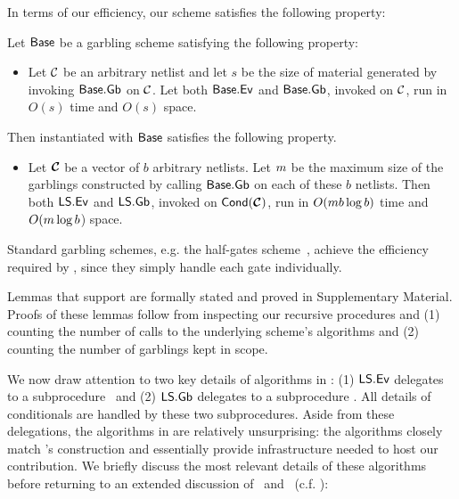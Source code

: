 In terms of our efficiency, our scheme satisfies the following
property:
\begin{theorem}\label{thm:efficiency}
  Let $\textsf{Base}$ be a garbling scheme satisfying the following
  property:
  \begin{itemize}
    \item Let $\mathcal C$ be an arbitrary netlist and let $s$ be the size of
      material generated by invoking $\textsf{Base}.\textsf{Gb}$ on $\mathcal C$.
      Let both $\textsf{Base}.\textsf{Ev}$ and $\textsf{Base}.\textsf{Gb}$, invoked
      on $\mathcal C$, run in $O(s)$ time and $O(s)$ space.
  \end{itemize}
  Then  instantiated with $\textsf{Base}$ satisfies the
  following property.
  \begin{itemize}
    \item Let $\vec{\cir}$ be a vector of $b$ arbitrary netlists. Let $m$ be
      the maximum size of the garblings constructed by calling
      $\textsf{Base}.\textsf{Gb}$ on each of these $b$ netlists.
      Then both $\textsf{LS}.\textsf{Ev}$ and $\textsf{LS}.\textsf{Gb}$, invoked on
      $\conditional(\vec{\cir})$, run in
      $O(m b \log b)$ time and $O(m \log b$) space.
  \end{itemize}
\end{theorem}
Standard garbling schemes, e.g. the
half-gates scheme~\cite{EC:ZahRosEva15}, achieve the efficiency
required by , since they simply handle each gate
individually.

Lemmas that support  are formally stated and proved in
Supplementary Material.
Proofs of these lemmas follow from inspecting our recursive procedures
and (1) counting the number of calls to the underlying scheme's
algorithms and (2) counting the number of garblings kept in scope.

We now draw attention to two key details of algorithms in
:
(1) $\textsf{LS}.\textsf{Ev}$ delegates to a subprocedure \evcond\ and (2)
$\textsf{LS}.\textsf{Gb}$ delegates to a subprocedure \gbcond.
%
All details of conditionals are handled by these two subprocedures.
%
Aside from these delegations, the algorithms in  are
relatively unsurprising:
the algorithms closely match \HK's construction and essentially
provide 
infrastructure needed to host our contribution.
%
We briefly discuss the most relevant details of these 
algorithms before returning
to an extended discussion of \evcond\ and \gbcond~(c.f. ):


